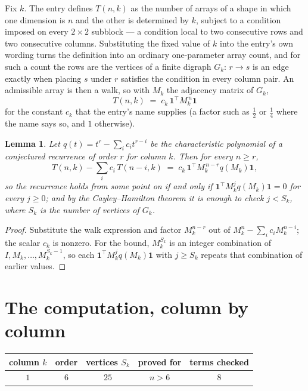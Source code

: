 \documentclass[11pt,a4paper]{article}
\theoremstyle{plain}
\newtheorem{lemma}[theorem]{Lemma}
\theoremstyle{definition}
\begin{document}
Fix $k$. The entry defines $T(n,k)$ as the number of arrays of a shape in which one dimension
is $n$ and the other is determined by $k$, subject to a condition imposed on every
$2\times2$ subblock --- a condition local to two consecutive rows and two consecutive columns.
Substituting the fixed value of $k$ into the entry's own wording turns the definition into an
ordinary one-parameter array count, and for such a count the rows are the vertices of a finite
digraph $G_k$: $r\to s$ is an edge exactly when placing $s$ under $r$ satisfies the condition
in every column pair. An admissible array is then a walk, so with $M_k$ the adjacency matrix
of $G_k$,
\[
T(n,k)\;=\;c_k\,\mathbf{1}^{\!\top}M_k^{\,n}\mathbf{1}
\]
for the constant $c_k$ that the entry's name supplies (a factor such as $\tfrac12$ or
$\tfrac14$ where the name says so, and $1$ otherwise).

\begin{lemma}\label{lem:crit}
Let $q(t)=t^{r}-\sum_i c_it^{r-i}$ be the characteristic polynomial of a conjectured
recurrence of order $r$ for column $k$. Then for every $n\ge r$,
\[
T(n,k)-\sum_i c_i\,T(n-i,k)\;=\;c_k\,\mathbf{1}^{\!\top}M_k^{\,n-r}q(M_k)\mathbf{1},
\]
so the recurrence holds from some point on if and only if
$\mathbf{1}^{\!\top}M_k^{j}q(M_k)\mathbf{1}=0$ for every $j\ge0$; and by the
Cayley--Hamilton theorem it is enough to check $j<S_k$, where $S_k$ is the number of vertices
of $G_k$.
\end{lemma}

\begin{proof}
Substitute the walk expression and factor $M_k^{n-r}$ out of $M_k^{n}-\sum_ic_iM_k^{n-i}$;
the scalar $c_k$ is nonzero. For the bound, $M_k^{S_k}$ is an integer combination of
$I,M_k,\dots,M_k^{S_k-1}$, so each $\mathbf{1}^{\!\top}M_k^{j}q(M_k)\mathbf{1}$ with
$j\ge S_k$ repeats that combination of earlier values.
\end{proof}

\section{The computation, column by column}

\begin{center}
\begin{tabular}{ccccc}
column $k$ & order & vertices $S_k$ & proved for & terms checked \\ \hline
$1$ & $6$ & $25$ & $n>6$ & $8$ \\
\end{tabular}
\end{center}
\end{document}
